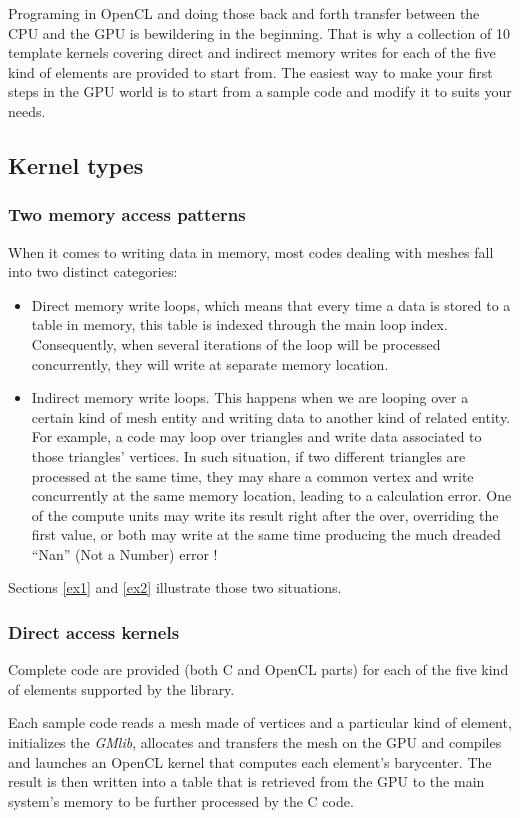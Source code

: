 \documentclass[a4paper,12pt]{article}
\begin{document}
Programing in OpenCL and doing those back and forth transfer between the CPU and the GPU is bewildering in the beginning. That is why a collection of 10 template kernels covering direct and indirect memory writes for each of the five kind of elements are provided to start from. The easiest way to make your first steps in the GPU world is to start from a sample code and modify it to suits your needs.

\subsection{Kernel types}
\subsubsection*{Two memory access patterns}
When it comes to writing data in memory, most codes dealing with meshes fall into two distinct categories:
\begin{itemize}
\item Direct memory write loops, which means that every time a data is stored to a table in memory, this table is indexed through the main loop index. Consequently, when several iterations of the loop will be processed concurrently, they will write at separate memory location.
\item Indirect memory write loops. This happens when we are looping over a certain kind of mesh entity and writing data to another kind of related entity. For example, a code may loop over triangles and write data associated to those triangles' vertices. In such situation, if two different triangles are processed at the same time, they may share a common vertex and write concurrently at the same memory location, leading to a calculation error. One of the compute units may write its result right after the over, overriding the first value, or both may write at the same time producing the much dreaded ``Nan'' (Not a Number) error !
\end{itemize}

Sections \ref{ex1} and \ref{ex2} illustrate those two situations.

\subsubsection*{Direct access kernels}
Complete code are provided (both C and OpenCL parts) for each of the five kind of elements supported by the library.

Each sample code reads a mesh made of vertices and a particular kind of element, initializes the \emph{GMlib}, allocates and transfers the mesh on the GPU and compiles and launches an OpenCL kernel that computes each element's barycenter. The result is then written into a table that is retrieved from the GPU to the main system's memory to be further processed by the C code.
\end{document}
